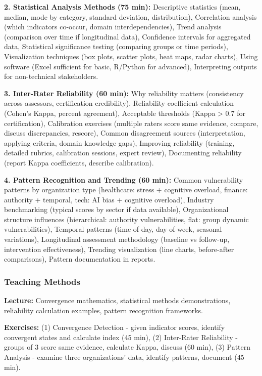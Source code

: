 \documentclass[11pt,a4paper]{article}
\begin{document}
\textbf{2. Statistical Analysis Methods (75 min):} Descriptive statistics (mean, median, mode by category, standard deviation, distribution), Correlation analysis (which indicators co-occur, domain interdependencies), Trend analysis (comparison over time if longitudinal data), Confidence intervals for aggregated data, Statistical significance testing (comparing groups or time periods), Visualization techniques (box plots, scatter plots, heat maps, radar charts), Using software (Excel sufficient for basic, R/Python for advanced), Interpreting outputs for non-technical stakeholders.

\textbf{3. Inter-Rater Reliability (60 min):} Why reliability matters (consistency across assessors, certification credibility), Reliability coefficient calculation (Cohen's Kappa, percent agreement), Acceptable thresholds (Kappa > 0.7 for certification), Calibration exercises (multiple raters score same evidence, compare, discuss discrepancies, rescore), Common disagreement sources (interpretation, applying criteria, domain knowledge gaps), Improving reliability (training, detailed rubrics, calibration sessions, expert review), Documenting reliability (report Kappa coefficients, describe calibration).

\textbf{4. Pattern Recognition and Trending (60 min):} Common vulnerability patterns by organization type (healthcare: stress + cognitive overload, finance: authority + temporal, tech: AI bias + cognitive overload), Industry benchmarking (typical scores by sector if data available), Organizational structure influences (hierarchical: authority vulnerabilities, flat: group dynamic vulnerabilities), Temporal patterns (time-of-day, day-of-week, seasonal variations), Longitudinal assessment methodology (baseline vs follow-up, intervention effectiveness), Trending visualization (line charts, before-after comparisons), Pattern documentation in reports.

\subsubsection{Teaching Methods}

\textbf{Lecture:} Convergence mathematics, statistical methods demonstrations, reliability calculation examples, pattern recognition frameworks.

\textbf{Exercises:} (1) Convergence Detection - given indicator scores, identify convergent states and calculate index (45 min), (2) Inter-Rater Reliability - groups of 3 score same evidence, calculate Kappa, discuss (60 min), (3) Pattern Analysis - examine three organizations' data, identify patterns, document (45 min).
\end{document}
